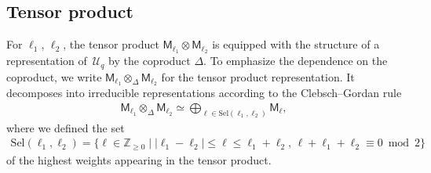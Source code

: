 \documentclass[10pt,a4paper]{amsart}
\numberwithin{equation}{section}
\newcommand{\bZ}{\mathbb{Z}}
\newcommand{\cU}{\mathcal{U}}
\newcommand{\sfM}{\mathsf{M}}
\newcommand{\UEA}{\cU}
\newcommand{\Uq}{\UEA_{q}}
\newcommand{\QGirrep}[1]{\sfM_{#1}}
\newcommand{\QGcoprod}{\Delta}
\newcommand{\Sel}{\mathrm{Sel}}
\begin{document}
\subsection{Tensor product}
For $\ell_{1}$, $\ell_{2}$, the tensor product $\QGirrep{\ell_{1}}\otimes \QGirrep{\ell_{2}}$ is equipped with the structure of a representation of~$\Uq$ by the coproduct $\QGcoprod$.
To emphasize the dependence on the coproduct, we write $\QGirrep{\ell_{1}}\otimes_{\QGcoprod}\QGirrep{\ell_{2}}$ for the tensor product representation.
It decomposes into irreducible representations according to the Clebsch--Gordan rule
\begin{gather}
\label{eq:QG_CGrule}
 \QGirrep{\ell_{1}}\otimes_{\QGcoprod} \QGirrep{\ell_{2}}\simeq \bigoplus_{\ell\in\Sel (\ell_{1},\ell_{2})}\QGirrep{\ell},
\end{gather}
where we defined the set
\begin{gather*}
 \Sel (\ell_{1},\ell_{2})= \{\ell\in \bZ_{\geq 0}\mid |\ell_{1}-\ell_{2}|\leq \ell \leq \ell_{1}+\ell_{2},\, \ell+\ell_{1}+\ell_{2}\equiv 0 \bmod 2 \}
\end{gather*}
of the highest weights appearing in the tensor product.
\end{document}
